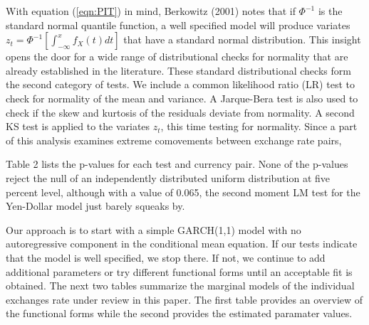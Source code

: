 \documentclass[12pt]{article}
\begin{document}
With equation (\ref{eqn:PIT}) in mind, Berkowitz (2001) notes that if
$\Phi^{-1}$ is the standard normal quantile function, a well specified
model will produce variates
$z_{t} = \Phi^{-1}\left[\int_{-\infty}^{x} f_{X}\left(t\right) dt \right]$
that have a standard normal distribution. This insight opens the door for
a wide range of distributional checks for normality that are already
established in the literature. These standard distributional checks form
the second category of tests. We include a common likelihood ratio (LR)
test to check for normality of the mean and variance. A Jarque-Bera test
is also used to check if the skew and kurtosis of the residuals deviate
from normality. A second KS test is applied to the variates $z_{t}$, this
time testing for normality. Since a part of this analysis examines extreme
comovements between exchange rate pairs,  


Table 2 lists the p-values for each test and currency pair. None of the
p-values reject the null of an independently distributed uniform
distribution at five percent level, although with a value of 0.065, the
second moment LM test for the Yen-Dollar model just barely squeaks by.


Our approach is to start with a simple GARCH(1,1) model with no
autoregressive component in the conditional mean equation. If our tests
indicate that the model is well specified, we stop there. If not, we
continue to add additional parameters or try different functional forms
until an acceptable fit is obtained. The next two tables summarize the
marginal models of the individual exchanges rate under review in this
paper. The first table provides an overview of the functional forms while
the second provides the estimated paramater values.

\vspace{10mm}
\end{document}
